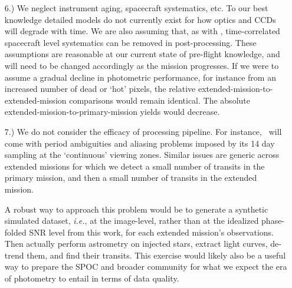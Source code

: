 \begin{itemize}
	
	\item [6.) We neglect instrument aging, spacecraft systematics, etc.]
	To our best knowledge detailed models do not currently exist for how \tesss optics and CCDs will degrade with time.
	We are also assuming that, as with \ktwo, time-correlated spacecraft level systematics can be removed in post-processing.
	These assumptions are reasonable at our current state of pre-flight knowledge, and will need to be changed accordingly as the mission progresses.
	If we were to assume a gradual decline in photometric performance, for instance from an increased number of dead or `hot' pixels, the relative extended-mission-to-extended-mission comparisons would remain identical.
	The absolute extended-mission-to-primary-mission yields would decrease.
	
	\item [7.) We do not consider the efficacy of processing pipeline.]
	For instance, \hemis\ will come with period ambiguities and aliasing problems imposed by its 14 day sampling at the `continuous' viewing zones.
	Similar issues are generic across extended missions for which we detect a small number of transits in the primary mission, and then a small number of transits in the extended mission.
	
	A robust way to approach this problem would be to generate a synthetic simulated \tess dataset, \textit{i.e.}, at the image-level, rather than at the idealized phase-folded SNR level from this work, for each extended mission's observations.
	Then actually perform astrometry on injected stars, extract light curves, de-trend them, and find their transits.
	This exercise would likely also be a useful way to prepare the SPOC and broader community for what we expect the era of \tess photometry to entail in terms of data quality.	
\end{itemize}


